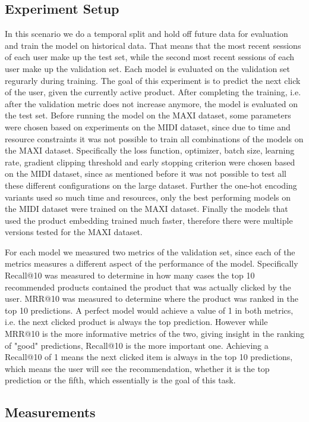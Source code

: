\subsection{Experiment Setup}\label{sec:exp_setup}
In this scenario we do a temporal split and hold off future data for evaluation and train the model on historical data.
That means that the most recent sessions of each user make up the test set, while the second most recent sessions of each user make up the validation set.
Each model is evaluated on the validation set regurarly during training.
The goal of this experiment is to predict the next click of the user, given the currently active product.
After completing the training, i.e. after the validation metric does not increase anymore, the model is evaluated on the test set.
Before running the model on the MAXI dataset, some parameters were chosen based on experiments on the MIDI dataset, since due to time and resource constraints it was not possible to train all combinations of the models on the MAXI dataset.
Specifically the loss function, optimizer, batch size, learning rate, gradient clipping threshold and early stopping criterion were chosen based on the MIDI dataset, since as mentioned before it was not possible to test all these different configurations on the large dataset.
Further the one-hot encoding variants used so much time and resources, only the best performing models on the MIDI dataset were trained on the MAXI dataset.
Finally the models that used the product embedding trained much faster, therefore there were multiple versions tested for the MAXI dataset.
\par
For each model we measured two metrics of the validation set, since each of the metrics measures a different aspect of the performance of the model.
Specifically Recall@10 was measured to determine in how many cases the top 10 recommended products contained the product that was actually clicked by the user.
MRR@10 was measured to determine where the product was ranked in the top 10 predictions.
A perfect model would achieve a value of 1 in both metrics, i.e. the next clicked product is always the top prediction.
However while MRR@10 is the more informative metrics of the two, giving insight in the ranking of "good" predictions, Recall@10 is the more important one.
Achieving a Recall@10 of 1 means the next clicked item is always in the top 10 predictions, which means the user will see the recommendation, whether it is the top prediction or the fifth, which essentially is the goal of this task.
\subsection{Measurements}

